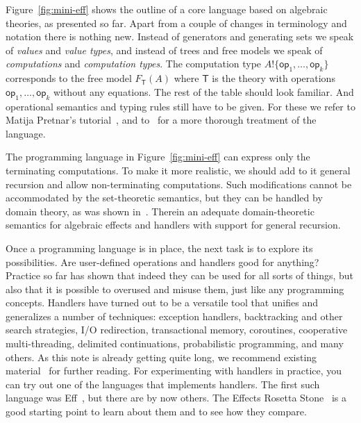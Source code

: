\documentclass{amsart}
\newcommand{\theory}[1]{\mathsf{#1}} %
\newcommand{\Free}[2]{F_{\theory{#1}}(#2)} %
\newcommand{\op}[1]{\mathsf{op}_{#1}} %
\newcommand{\dirt}[2]{#1 \mathbin{!} #2} %
\begin{document}
Figure~\ref{fig:mini-eff} shows the outline of a core language based on
algebraic theories, as presented so far. Apart from a couple of changes in
terminology and notation there is nothing new. Instead of generators and
generating sets we speak of \emph{values} and \emph{value types}, and instead of
trees and free models we speak of \emph{computations} and \emph{computation
  types}. The computation type $\dirt{A}{\{\op{1}, \ldots, \op{k}\}}$
corresponds to the free model $\Free{T}{A}$ where $\theory{T}$ is the theory
with operations $\op{1}, \ldots, \op{k}$ without any equations. The rest of the
table should look familiar. And operational semantics and typing rules still
have to be given. For these we refer to Matija Pretnar's
tutorial~\cite{pretnar15:_introd_algeb_effec_handl}, and
to~\cite{bauer14:_effec_system_algeb_effec_handl,pretnar14:_infer_algeb_effec}
for a more thorough treatment of the language.

The programming language in Figure~\ref{fig:mini-eff} can express only the
terminating computations. To make it more realistic, we should add to it general
recursion and allow non-terminating computations. Such modifications cannot be
accommodated by the set-theoretic semantics, but they can be handled by domain
theory, as was shown in~\cite{bauer14:_effec_system_algeb_effec_handl}. Therein an adequate
domain-theoretic semantics for algebraic effects and handlers with support for
general recursion.

Once a programming language is in place, the next task is to explore its
possibilities. Are user-defined operations and handlers good for anything?
Practice so far has shown that indeed they can be used for all sorts of things,
but also that it is possible to overused and misuse them, just like any
programming concepts. Handlers have turned out to be a versatile tool that
unifies and generalizes a number of techniques: exception handlers, backtracking
and other search strategies, I/O redirection, transactional memory, coroutines,
cooperative multi-threading, delimited continuations, probabilistic programming,
and many others. As this note is already getting quite long, we recommend
existing
material~\cite{pretnar15:_introd_algeb_effec_handl,bauer15:_progr,kammar13:_handl}
for further reading. For experimenting with handlers in practice, you can try
out one of the languages that implements handlers. The first such language was
Eff~\cite{bauer:_eff}, but there are by now others. The Effects Rosetta
Stone~\cite{effec_roset_stone} is a good starting point to learn about them and
to see how they compare.
\end{document}
